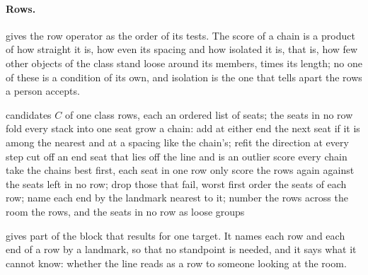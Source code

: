 \paragraph{Rows.}
 gives the row operator as the order of its tests.
The score of a chain is a product of how straight it is, how even its spacing and how isolated it is, that is, how few other objects of the class stand loose around its members, times its length; no one of these is a condition of its own, and isolation is the one that tells apart the rows a person accepts.
\begin{algorithm}[t]
\caption{Rows among the candidates of one class}
\label{alg:rows}
\begin{algorithmic}[1]
\small
\Require candidates $C$ of one class
\Ensure rows, each an ordered list of seats; the seats in no row
\State fold every stack into one seat
  \State grow a chain: add at either end the next seat if it is among the nearest and at a spacing like the chain's; refit the direction at every step
  \State cut off an end seat that lies off the line and is an outlier
\EndFor
\State score every chain
\State take the chains best first, each seat in one row only
\State score the rows again against the seats left in no row; drop those that fail, worst first
\State order the seats of each row; name each end by the landmark nearest to it; number the rows across the room
\State \Return the rows, and the seats in no row as loose groups
\end{algorithmic}
\end{algorithm}
 gives part of the block that results for one target.
It names each row and each end of a row by a landmark, so that no standpoint is needed, and it says what it cannot know: whether the line reads as a row to someone looking at the room.
